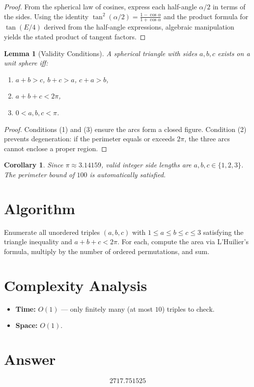 \documentclass[12pt]{article}
\newtheorem{lemma}[theorem]{Lemma}
\newtheorem{corollary}[theorem]{Corollary}
\begin{document}
\begin{proof}
From the spherical law of cosines, express each half-angle $\alpha/2$ in terms of the sides. Using the identity $\tan^2(\alpha/2) = \frac{1-\cos\alpha}{1+\cos\alpha}$ and the product formula for $\tan(E/4)$ derived from the half-angle expressions, algebraic manipulation yields the stated product of tangent factors.
\end{proof}

\begin{lemma}[Validity Conditions]
A spherical triangle with sides $a, b, c$ exists on a unit sphere iff:
\begin{enumerate}
    \item $a + b > c$, $b + c > a$, $c + a > b$,
    \item $a + b + c < 2\pi$,
    \item $0 < a, b, c < \pi$.
\end{enumerate}
\end{lemma}

\begin{proof}
Conditions (1) and (3) ensure the arcs form a closed figure. Condition (2) prevents degeneration: if the perimeter equals or exceeds $2\pi$, the three arcs cannot enclose a proper region.
\end{proof}

\begin{corollary}
Since $\pi \approx 3.14159$, valid integer side lengths are $a, b, c \in \{1, 2, 3\}$. The perimeter bound of $100$ is automatically satisfied.
\end{corollary}

\section{Algorithm}

Enumerate all unordered triples $(a,b,c)$ with $1 \le a \le b \le c \le 3$ satisfying the triangle inequality and $a+b+c < 2\pi$. For each, compute the area via L'Huilier's formula, multiply by the number of ordered permutations, and sum.

\section{Complexity Analysis}

\begin{itemize}
    \item \textbf{Time:} $O(1)$ --- only finitely many (at most $10$) triples to check.
    \item \textbf{Space:} $O(1)$.
\end{itemize}

\section{Answer}

\[
\boxed{2717.751525}
\]
\end{document}
